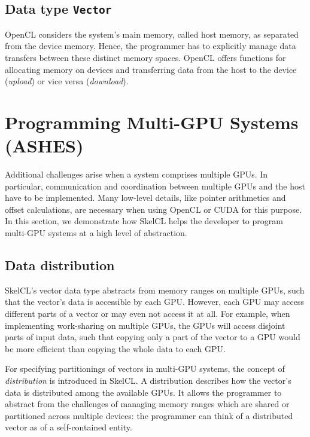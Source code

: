 \subsection{Data type \texttt{Vector}}
\label{sec:skelcl_vector}

OpenCL considers the system's main memory, called host memory, as separated from the device memory.
Hence, the programmer has to explicitly manage data transfers between these distinct memory spaces.
OpenCL offers functions for allocating memory on devices and transferring data from the host to the device (\emph{upload}) or vice versa (\emph{download}).


\section{Programming Multi-GPU Systems (ASHES)}

Additional challenges arise when a system comprises multiple GPUs.
In particular, communication and coordination between multiple GPUs and the host have to be implemented.
Many low-level details, like pointer arithmetics and offset calculations, are necessary when using OpenCL or CUDA for this purpose.
In this section, we demonstrate how SkelCL helps the developer to program multi-GPU systems at a high level of abstraction.

\subsection{Data distribution}

SkelCL's vector data type abstracts from memory ranges on multiple GPUs, such that the vector's data is accessible by each GPU.
However, each GPU may access different parts of a vector or may even not access it at all.
For example, when implementing work-sharing on multiple GPUs, the GPUs will access disjoint parts of input data, such that copying only a part of the vector to a GPU would be more efficient than copying the whole data to each GPU.

For specifying partitionings of vectors in multi-GPU systems, the concept of \emph{distribution} is introduced in SkelCL.
A distribution describes how the vector's data is distributed among the available GPUs.
It allows the programmer to abstract from the challenges of managing memory ranges which are shared or partitioned across multiple devices: the programmer can think of a distributed vector as of a self-contained entity.

